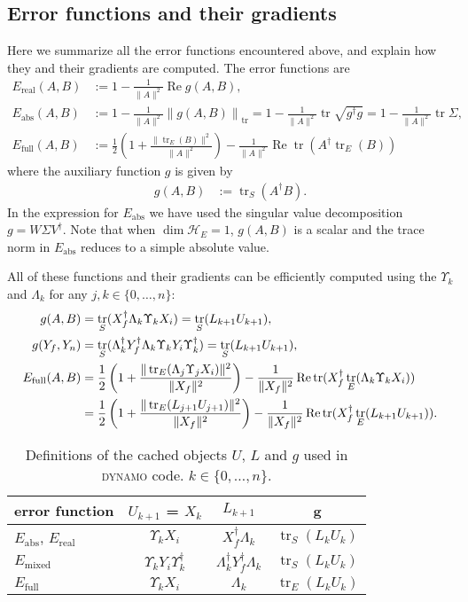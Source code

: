 \documentclass[aps, pra, a4paper, longbibliography, superscriptaddress]{revtex4-1}
\newcommand{\hilb}[1]{\mathcal{#1}}
\DeclareMathOperator{\tr}{tr}
\DeclareMathOperator{\re}{Re}
\newcommand{\spr}{\Upsilon}
\newcommand{\DYNAMO}{\textsc{dynamo}}
\begin{document}
\subsection{Error functions and their gradients}

Here we summarize all the error functions encountered above, and explain how they and their gradients are computed.
The error functions are
\begin{align}
E_\text{real}(A, B) &:= 1 -\frac{1}{\|A\|^2} \re g(A, B),\\
E_\text{abs}(A, B) &:= 1 -\frac{1}{\|A\|^2} \left\|g(A, B)\right\|_{\tr}
= 1 -\frac{1}{\|A\|^2} \tr \sqrt{g^\dagger g}
= 1 -\frac{1}{\|A\|^2} \tr \Sigma,\\
E_\text{full}(A, B) &:= \frac{1}{2}\left(1 +\frac{\|\tr_E(B)\|^2}{\|A\|^2}\right) -\frac{1}{\|A\|^2} \re \tr(A^\dagger \tr_E(B))
\end{align}
where the auxiliary function $g$ is given by
\begin{align}
g(A, B) &:= \tr_S(A^\dagger B).
\end{align}
In the expression for $E_\text{abs}$ we have used the singular value decomposition $g = W \Sigma V^\dagger$.
Note that when $\dim \hilb{H}_E = 1$, $g(A,B)$ is a scalar and the trace norm in $E_\text{abs}$
reduces to a simple absolute value.


All of these functions and their gradients can be efficiently computed
using the $\spr_k$ and $\Lambda_k$
for any $j, k \in \{0, \ldots, n\}$:
\begin{align}
g(A, B) &= \tr_S(X_f^\dagger \Lambda_k \spr_k X_i)
= \tr_S(L_{k+1} U_{k+1}),\\
g(Y_f, Y_n) &= \tr_S(\Lambda_k^\dagger Y_f^\dagger \Lambda_k \spr_k Y_i \spr_k^\dagger)
= \tr_S(L_{k+1} U_{k+1}),\\
\notag
E_\text{full}(A, B) &= \frac{1}{2}\left(1 +\frac{\|\tr_E(\Lambda_j \spr_j X_i)\|^2}{\|X_f\|^2}\right)
-\frac{1}{\|X_f\|^2} \re \tr(X_f^\dagger \tr_E(\Lambda_k \spr_k X_i))\\
&= \frac{1}{2}\left(1 +\frac{\|\tr_E(L_{j+1} U_{j+1})\|^2}{\|X_f\|^2}\right)
-\frac{1}{\|X_f\|^2} \re \tr(X_f^\dagger \tr_E(L_{k+1} U_{k+1})).
\end{align}

\begin{table}
\begin{tabular}{l|c|c|c}
error function & $U_{k+1}$ = $X_k$ & $L_{k+1}$ & g\\
\hline
$E_\text{abs}$, $E_\text{real}$ & $\spr_k X_i$ & $X_f^\dagger \Lambda_k$ & $\tr_S(L_k U_k)$\\
$E_\text{mixed}$ & $\spr_k Y_i \spr_k^\dagger$ & $\Lambda_k^\dagger Y_f^\dagger \Lambda_k$ & $\tr_S(L_k U_k)$\\
$E_\text{full}$ & $\spr_k X_i$ & $\Lambda_k$ & $\tr_E(L_k U_k)$
\end{tabular}
\caption{Definitions of the cached objects $U$, $L$ and $g$ used in \DYNAMO{}
  code. $k \in \{0, \ldots, n\}$.}
\label{table:UL}
\end{table}
\end{document}
